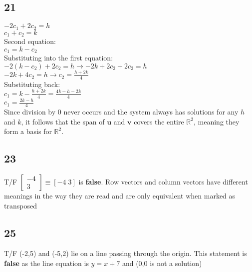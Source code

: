 \documentclass{article}
\begin{document}
\subsection*{21}
$ -2c_1 + 2c_2 = h $  \\
$ c_1 + c_2 = k $  \\
Second equation:  \\
$ c_1 = k - c_2 $  \\
Substituting into the first equation:  \\
$ -2(k - c_2) + 2c_2 = h \rightarrow -2k + 2c_2 + 2c_2 = h $  \\
$ -2k + 4c_2 = h \rightarrow c_2 = \frac{h + 2k}{4} $  \\
Substituting back:  \\
$ c_1 = k - \frac{h + 2k}{4} = \frac{4k - h - 2k}{4} $  
\\$ c_1 = \frac{2k - h}{4} $ \\ 
Since division by 0 never occurs and the system always has solutions for any $ h $ and $ k $, it follows that the span of $ \mathbf{u} $ and $ \mathbf{v} $ covers the entire $ \mathbb{R}^2 $, meaning they form a basis for $ \mathbb{R}^2 $.  
\subsection*{23}
T/F $\left[\begin{array}{c}
    -4\\3
\end{array}\right]\equiv \left[-4 \; 3\right]$ is \textbf{false}. Row vectors and column vectors have different meanings in the way they are read and are only equivalent when marked as transposed
\subsection*{25}
T/F (-2,5) and (-5,2) lie on a line passing through the origin. This statement is \textbf{false} as the line equation is $y=x+7$ and (0,0 is not a solution)
\end{document}

